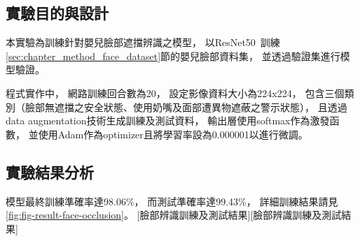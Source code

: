 \documentclass[class=NCU_thesis, crop=false]{standalone}
\begin{document}
\subsection{實驗目的與設計}
本實驗為訓練針對嬰兒臉部遮擋辨識之模型，
以ResNet50~\cite{he_deep_2016}訓練\ref{sec:chapter_method_face_dataset}節的嬰兒臉部資料集，
並透過驗證集進行模型驗證。

程式實作中，
網路訓練回合數為20，
設定影像資料大小為224x224，
包含三個類別（臉部無遮擋之安全狀態、使用奶嘴及面部遭異物遮蔽之警示狀態），
且透過data augmentation技術生成訓練及測試資料，
輸出層使用softmax作為激發函數，
並使用Adam作為optimizer且將學習率設為0.000001以進行微調。

\subsection{實驗結果分析}
模型最終訓練準確率達98.06\%，
而測試準確率達99.43\%，
詳細訓練結果請見\cref{fig:fig-result-face-occlusion}。
[臉部辨識訓練及測試結果][臉部辨識訓練及測試結果]
\end{document}
